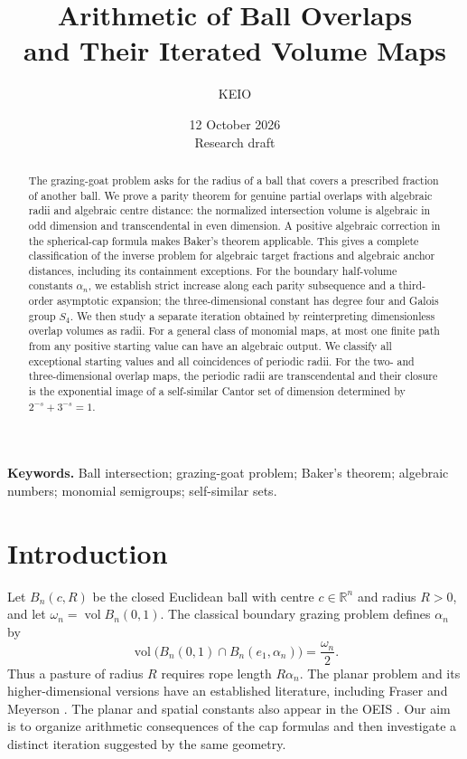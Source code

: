\documentclass[11pt,a4paper]{article}
\title{Arithmetic of Ball Overlaps\texorpdfstring{\\}{ }and Their Iterated Volume Maps}
\author{KEIO}
\date{12 October 2026\\[3pt]\small Research draft}
\numberwithin{equation}{section}
\theoremstyle{definition}
\theoremstyle{remark}
\newcommand{\R}{\mathbb R}
\newcommand{\vol}{\operatorname{vol}}
\begin{document}
\maketitle
\begin{abstract}
The grazing-goat problem asks for the radius of a ball that covers a prescribed fraction of another ball. We prove a parity theorem for genuine partial overlaps with algebraic radii and algebraic centre distance: the normalized intersection volume is algebraic in odd dimension and transcendental in even dimension. A positive algebraic correction in the spherical-cap formula makes Baker's theorem applicable. This gives a complete classification of the inverse problem for algebraic target fractions and algebraic anchor distances, including its containment exceptions. For the boundary half-volume constants $\alpha_n$, we establish strict increase along each parity subsequence and a third-order asymptotic expansion; the three-dimensional constant has degree four and Galois group $S_4$. We then study a separate iteration obtained by reinterpreting dimensionless overlap volumes as radii. For a general class of monomial maps, at most one finite path from any positive starting value can have an algebraic output. We classify all exceptional starting values and all coincidences of periodic radii. For the two- and three-dimensional overlap maps, the periodic radii are transcendental and their closure is the exponential image of a self-similar Cantor set of dimension determined by $2^{-s}+3^{-s}=1$.
\end{abstract}
\noindent\textbf{Keywords.} Ball intersection; grazing-goat problem; Baker's theorem; algebraic numbers; monomial semigroups; self-similar sets.

\section{Introduction}

Let $B_n(c,R)$ be the closed Euclidean ball with centre $c\in\R^n$ and radius $R>0$, and let $\omega_n=\vol B_n(0,1)$. The classical boundary grazing problem defines $\alpha_n$ by
\begin{equation}\label{eq:alpha-def}
 \vol\bigl(B_n(0,1)\cap B_n(e_1,\alpha_n)\bigr)=\frac{\omega_n}{2}.
\end{equation}
Thus a pasture of radius $R$ requires rope length $R\alpha_n$. The planar problem and its higher-dimensional versions have an established literature, including Fraser \cite{Fraser} and Meyerson \cite{Meyerson}. The planar and spatial constants also appear in the OEIS \cite{OEIS2,OEIS3}. Our aim is to organize arithmetic consequences of the cap formulas and then investigate a distinct iteration suggested by the same geometry.
\end{document}
